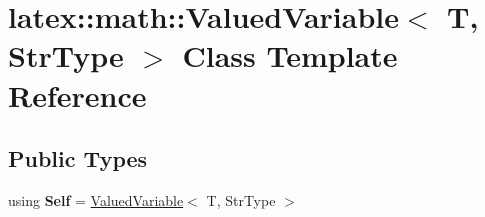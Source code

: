 \hypertarget{classlatex_1_1math_1_1ValuedVariable}{\section{latex\-:\-:math\-:\-:Valued\-Variable$<$ T, Str\-Type $>$ Class Template Reference}
\label{classlatex_1_1math_1_1ValuedVariable}
}
\subsection*{Public Types}
\begin{DoxyCompactItemize}
\item 
\hypertarget{classlatex_1_1math_1_1ValuedVariable_a65db9f4fd2731bde724e7c9b30385045}{using {\bfseries Self} = \hyperlink{classlatex_1_1math_1_1ValuedVariable}{Valued\-Variable}$<$ T, Str\-Type $>$}\label{classlatex_1_1math_1_1ValuedVariable_a65db9f4fd2731bde724e7c9b30385045}

\end{DoxyCompactItemize}
